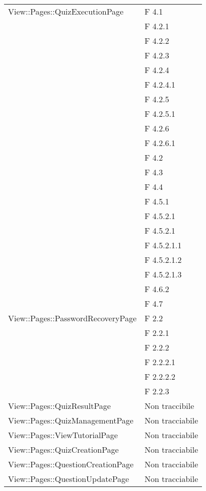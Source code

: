 \begin{longtable}{p{}p{}}
\midrule
View::Pages::QuizExecutionPage
								& F 4.1\\
								& F 4.2.1\\
								& F 4.2.2\\
								& F 4.2.3\\
								& F 4.2.4\\
								& F 4.2.4.1\\
								& F 4.2.5\\
								& F 4.2.5.1\\
								& F 4.2.6\\
								& F 4.2.6.1\\
								& F 4.2\\
								& F 4.3\\
								& F 4.4\\
								& F 4.5.1\\
								& F 4.5.2.1\\
								& F 4.5.2.1\\
								& F 4.5.2.1.1\\
								& F 4.5.2.1.2\\
								& F 4.5.2.1.3\\
								& F 4.6.2\\
& F 4.7\\

\midrule
View::Pages::PasswordRecoveryPage	& F 2.2\\
								& F 2.2.1\\
								& F 2.2.2\\
								& F 2.2.2.1\\
								& F 2.2.2.2\\
								& F 2.2.3\\


\midrule
View::Pages::QuizResultPage	& Non traccibile\\	
							
\midrule
View::Pages::QuizManagementPage	& Non tracciabile\\

\midrule
View::Pages::ViewTutorialPage	& Non tracciabile\\

\midrule
View::Pages::QuizCreationPage	& Non tracciabile\\

\midrule
View::Pages::QuestionCreationPage	& Non tracciabile\\

\midrule
View::Pages::QuestionUpdatePage	& Non tracciabile\\


\end{longtable}
